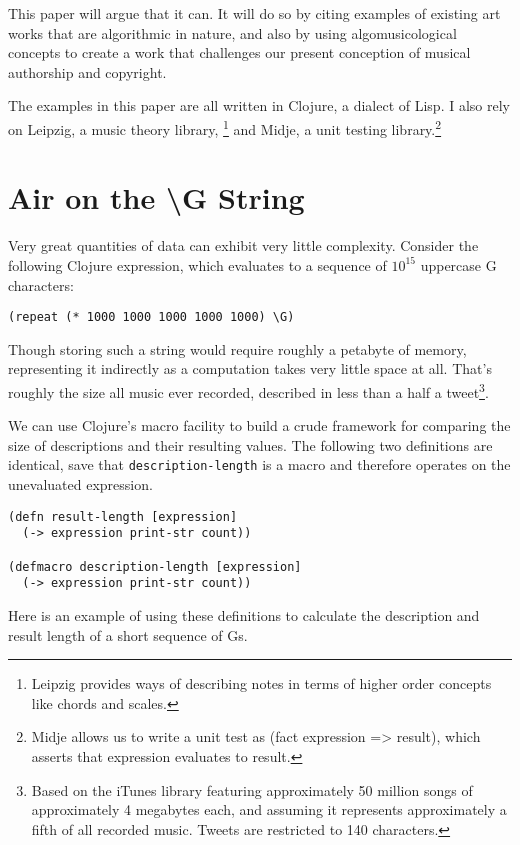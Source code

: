 \documentclass[numbers]{sigplanconf}
\begin{document}
This paper will argue that it can. It will do so by citing examples of existing art works that are algorithmic in nature, and
also by using algomusicological concepts to create a work that challenges our present conception of musical authorship and
copyright.

The examples in this paper are all written in Clojure, a dialect of Lisp. I also rely on Leipzig, a music theory library,
\footnote{Leipzig provides ways of describing notes in terms of higher order concepts like chords and scales.}
and Midje, a unit testing library.\footnote{Midje allows us to write a unit test as (fact expression => result),
which asserts that expression evaluates to result.}

\section{Air on the {\textbackslash}G String}
Very great quantities of data can exhibit very little complexity. Consider the following Clojure expression, which
evaluates to a sequence of $10^{15}$ uppercase G characters:

\begin{verbatim}
(repeat (* 1000 1000 1000 1000 1000) \G)
\end{verbatim}

Though storing such a string would require roughly a petabyte of memory, representing it indirectly as a computation
takes very little space at all. That's roughly the size all music ever recorded,
described in less than a half a tweet\footnote{Based on the iTunes library featuring approximately 50 million songs
of approximately 4 megabytes each, and assuming it represents approximately a fifth of all recorded music. Tweets are
restricted to 140 characters.}.

We can use Clojure's macro facility to build a crude framework for comparing the size of descriptions and their
resulting values. The following two definitions are identical, save that \verb|description-length| is a macro and therefore
operates on the unevaluated expression.

\begin{verbatim}
(defn result-length [expression]
  (-> expression print-str count))

(defmacro description-length [expression]
  (-> expression print-str count))
\end{verbatim}

Here is an example of using these definitions to calculate the description and result length of a short sequence of Gs.
\end{document}
